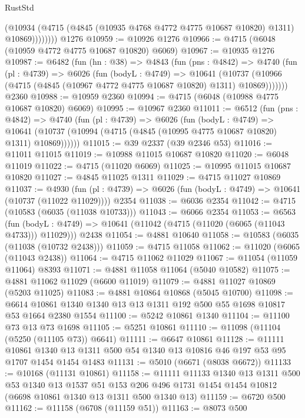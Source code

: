 \begin{lexlean}{RustStd}
\begin{coremodule}
                (@10934 (@4715 (@4845 (@10935 @4768 @4772 @4775 @10687 @10820) @1311) @10869))))))))
    @1276
@10959 := @10926 @1276
@10966 := @4715 (@6048 (@10959 @4772 @4775 @10687 @10820) @6069)
@10967 := @10935 @1276
@10987 := @6482
    (fun (hn : @38) =>
    @4843
      (fun (pns : @4842) =>
      @4740
        (fun (pl : @4739) =>
        @6026
          (fun (bodyL : @4749) =>
          @10641
            (@10737 (@10966 (@4715 (@4845 (@10967 @4772 @4775 @10687 @10820) @1311) @10869)))))))
    @2360
@10988 := @10959 @2360
@10994 := @4715 (@6048 (@10988 @4775 @10687 @10820) @6069)
@10995 := @10967 @2360
@11011 := @6512
    (fun (pns : @4842) =>
    @4740
      (fun (pl : @4739) =>
      @6026
        (fun (bodyL : @4749) =>
        @10641 (@10737 (@10994 (@4715 (@4845 (@10995 @4775 @10687 @10820) @1311) @10869))))))
@11015 := @39 @2337 (@39 @2346 @53)
@11016 := @11011 @11015
@11019 := @10988 @11015 @10687 @10820
@11020 := @6048 @11019
@11022 := @4715 (@11020 @6069)
@11025 := @10995 @11015 @10687 @10820
@11027 := @4845 @11025 @1311
@11029 := @4715 @11027 @10869
@11037 := @4930
    (fun (pl : @4739) => @6026 (fun (bodyL : @4749) => @10641 (@10737 (@11022 @11029))))
    @2354
@11038 := @6036 @2354
@11042 := @4715 (@10583 (@6035 (@11038 @10733)))
@11043 := @6066 @2354
@11053 := @6563
    (fun (bodyL : @4749) => @10641 (@11042 (@4715 (@11020 (@6065 (@11043 @4733))) @11029)))
    @2438
@11054 := @4881 @10640
@11058 := @10583 (@6035 (@11038 (@10732 @2438)))
@11059 := @4715 @11058
@11062 := @11020 (@6065 (@11043 @2438))
@11064 := @4715 @11062 @11029
@11067 := @11054 (@11059 @11064) @8393
@11071 := @4881 @11058 @11064 (@5040 @10582)
@11075 := @4881 @11062 @11029 (@6600 @11019)
@11079 := @4881 @11027 @10869 (@5203 @11025)
@11083 := @4881 @10864 @10868 (@5045 @10700)
@11098 := @6614 @10861 @1340 @1340 @13 @13 @1311 @192 @500 @55 @1698 @10817 @53 @1664 @2380 @1554
@11100 := @5242 @10861 @1340
@11104 := @11100 @73 @13 @73 @1698
@11105 := @5251 @10861
@11110 := @11098 (@11104 (@5250 (@11105 @73)) @6641)
@11111 := @6647 @10861
@11128 := @11111
    @10861
    @1340
    @13
    @1311
    @500
    @54
    @1340
    @13
    @10816
    @46
    @197
    @53
    @95
    @1707
    @1454
    @1454
    @1483
@11131 := @5010 (@6671 (@8038 @6672))
@11133 := @10168 (@11131 @10861)
@11158 := @11111
    @11133
    @1340
    @13
    @1311
    @500
    @53
    @1340
    @13
    @1537
    @51
    @153
    @206
    @496
    @1731
    @1454
    @1454
    @10812
    (@6698 @10861 @1340 @13 @1311 @500 @1340 @13)
@11159 := @6720 @500
@11162 := @11158 (@6708 (@11159 @51))
@11163 := @8073 @500

\end{coremodule}
\end{lexlean}
